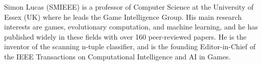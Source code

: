 \documentclass[journal]{IEEEtran}
\begin{document}
\begin{IEEEbiography}{Simon Lucas}
(SMIEEE) is a professor of Computer Science at the University of Essex (UK) where he leads the Game Intelligence Group. His main research interests are games, evolutionary computation, and machine learning, and he has published widely in these fields with over 160 peer-reviewed papers. He is the inventor of the scanning n-tuple classifier, and is the founding Editor-in-Chief of the IEEE Transactions on Computational Intelligence and AI in Games.
\end{IEEEbiography}






\end{document}
